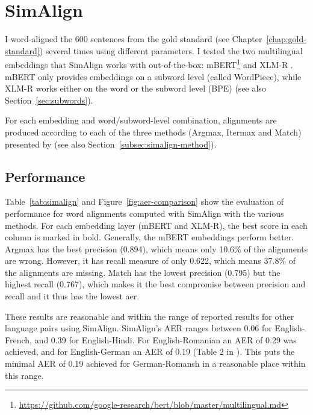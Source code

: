 \section{SimAlign}\label{sec:performance-simalign}
I word-aligned the 600 sentences from the gold standard (see Chapter~\ref{chap:gold-standard}) several times using different parameters. 
I tested the two multilingual embeddings that SimAlign works with out-of-the-box: mBERT\footnote{\url{https://github.com/google-research/bert/blob/master/multilingual.md}} and XLM-R \autocite{conneau-etal-2020-xlm}. 
mBERT only provides embeddings on a subword level (called WordPiece), while XLM-R works either on the word or the subword level (BPE) \autocite{jalili-sabet-etal-2020-simalign} (see also Section~\ref{sec:subwords}). 

For each embedding and word/subword-level combination, alignments are produced according to each of the three methods (Argmax, Itermax and Match) presented by \textcite{jalili-sabet-etal-2020-simalign} (see also Section~\ref{subsec:simalign-method}).

\subsection{Performance}
Table~\ref{tab:simalign} and Figure~\ref{fig:aer-comparison} show the evaluation of performance for word alignments computed with SimAlign with the various methods. 
For each embedding layer (mBERT and XLM-R), the best score in each column is marked in bold. 
Generally, the mBERT embeddings perform better. 
Argmax has the best precision (0.894), which means only 10.6\% of the alignments are wrong. 
However, it has recall measure of only 0.622, which means 37.8\% of the alignments are missing.
Match has the lowest precision (0.795) but the highest recall (0.767), which makes it the best compromise between precision and recall and it thus has the lowest \acrshort{aer}.

These results are reasonable and within the range of reported results for other language pairs using SimAlign. 
SimAlign's AER ranges between 0.06 for English-French, and 0.39 for English-Hindi. 
For English-Romanian an AER of 0.29 was achieved, and for English-German an AER of 0.19 (Table 2 in \textcite{jalili-sabet-etal-2020-simalign}). 
This puts the minimal AER of 0.19 achieved for German-Romansh in a reasonable place within this range.

